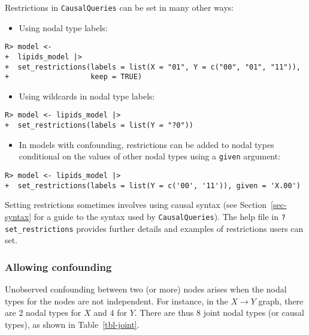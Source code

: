\documentclass[
  11pt,
  article]{jss}
\providecommand{\tightlist}{%
  \setlength{\itemsep}{0pt}\setlength{\parskip}{0pt}}\usepackage{longtable,booktabs,array}
\begin{document}
Restrictions in \texttt{CausalQueries} can be set in many other ways:

\begin{itemize}
\tightlist
\item
  Using nodal type labels:
\end{itemize}

\begin{verbatim}
R> model <- 
+  lipids_model |>
+  set_restrictions(labels = list(X = "01", Y = c("00", "01", "11")), 
+                   keep = TRUE)
\end{verbatim}

\begin{itemize}
\tightlist
\item
  Using wildcards in nodal type labels:
\end{itemize}

\begin{verbatim}
R> model <- lipids_model |>
+  set_restrictions(labels = list(Y = "?0"))
\end{verbatim}

\begin{itemize}
\tightlist
\item
  In models with confounding, restrictions can be added to nodal types
  conditional on the values of other nodal types using a \texttt{given}
  argument:
\end{itemize}

\begin{verbatim}
R> model <- lipids_model |>
+  set_restrictions(labels = list(Y = c('00', '11')), given = 'X.00')
\end{verbatim}

Setting restrictions sometimes involves using causal syntax (see
Section~\ref{sec-syntax} for a guide to the syntax used by
\texttt{CausalQueries}). The help file in \texttt{?set\_restrictions}
provides further details and examples of restrictions users can set.

\subsubsection{Allowing confounding}\label{sec-confounding}

Unobserved confounding between two (or more) nodes arises when the nodal
types for the nodes are not independent. For instance, in the
\(X \rightarrow Y\) graph, there are \(2\) nodal types for \(X\) and
\(4\) for \(Y\). There are thus \(8\) joint nodal types (or causal
types), as shown in Table~\ref{tbl-joint}.
\end{document}
